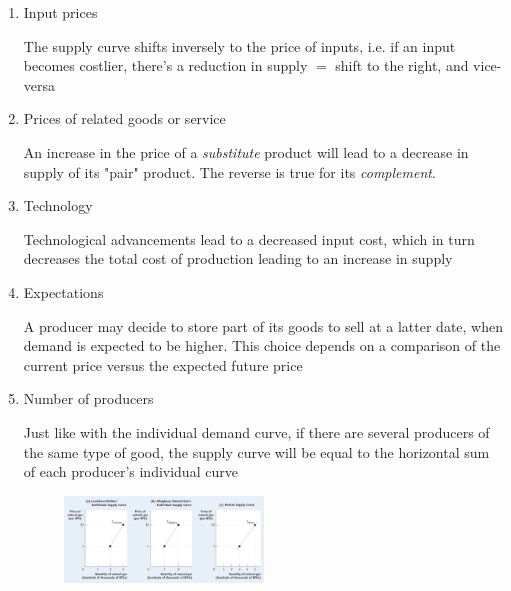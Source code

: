 \documentclass[english,course]{Notes}
\newcommand{\ita}[1]{\textit{#1}}
\begin{document}
\begin{enumerate}
	\item Input prices
	
	
	\par{The supply curve shifts inversely to the price of inputs, i.e. if an input becomes costlier, there's a reduction in supply $=$ shift to the right, and vice-versa}
	
	\item Prices of related goods or service
	
	\par{An increase in the price of a \ita{substitute} product will lead to a decrease in supply of its "pair" product. The reverse is true for its \ita{complement}.}
	

	\item Technology
	
	\par{Technological advancements lead to a decreased input cost, which in turn decreases the total cost of production leading to an increase in supply}
	
	\item Expectations
	
	\par{A producer may decide to store part of its goods to sell at a latter date, when demand is expected to be higher. This choice depends on a comparison of the current price versus the expected future price}
	
	\item Number of producers
	
	\par{Just like with the individual demand curve, if there are several producers of the same type of good, the supply curve will be equal to the horizontal sum of each producer's individual curve}
	
	\begin{figure}[ht]
\centering
\includegraphics[width=0.5\textwidth]{supplyIndividual}
\end{figure}

\end{enumerate}
\end{document}
